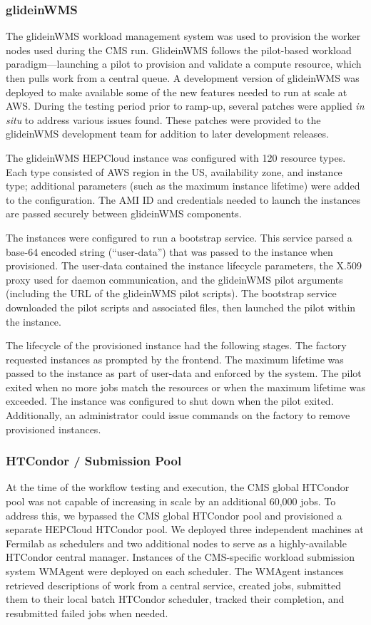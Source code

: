 \documentclass[twocolumn]{svjour3}          %
\begin{document}
\subsubsection{glideinWMS}
The glideinWMS workload management system \cite{Sfiligoi,Mhashilkar} was used to provision the worker nodes used during the CMS run. GlideinWMS
follows the pilot-based workload paradigm---launching a pilot to provision and validate a compute resource, which then pulls work
from a central queue.
A development version of glideinWMS was deployed to make available some of the new features needed to run at scale at AWS.  During the testing period prior to ramp-up, several patches were applied \textit{in situ} to address various issues found. These patches were provided to the glideinWMS development team for addition to later development releases.

The glideinWMS HEPCloud instance was configured with 120 resource types. Each type consisted of
AWS region in the US, availability zone, and instance type; additional parameters (such as the maximum instance lifetime) were added to the configuration.
The AMI ID and credentials needed to launch the instances are passed securely between glideinWMS components.

The instances were configured to run a bootstrap service. This service parsed a base-64 encoded string (``user-data'') that was passed to the instance when provisioned. The user-data contained the instance lifecycle parameters, the X.509 proxy used for daemon communication, and the glideinWMS pilot arguments (including the URL of the glideinWMS pilot scripts). The bootstrap service downloaded the pilot scripts and associated files, then launched the pilot within the instance.

The lifecycle of the provisioned instance had the following stages. The factory requested instances as prompted by the frontend. The maximum lifetime was passed to the instance as part of user-data and enforced by the system. The pilot exited when no more jobs match the resources or when the maximum lifetime was exceeded. The instance was configured to shut down when the pilot exited. Additionally, an administrator could issue commands on the factory to remove provisioned instances.

\subsubsection{HTCondor / Submission Pool}
At the time of the workflow testing and execution, the CMS global HTCondor pool \cite{htcondor,cms_condor} was not capable of increasing in scale by an additional 60,000 jobs. To address this, we bypassed the CMS global HTCondor pool and provisioned a separate HEPCloud HTCondor pool. We deployed three independent machines at Fermilab as schedulers and two additional nodes to serve as a highly-available HTCondor central manager. Instances of the CMS-specific workload submission system WMAgent \cite{wmagent} were deployed on each scheduler. The WMAgent instances retrieved descriptions of work from
a central service, created jobs, submitted them to their local batch HTCondor scheduler, tracked their completion, and resubmitted failed jobs when needed.
\end{document}
